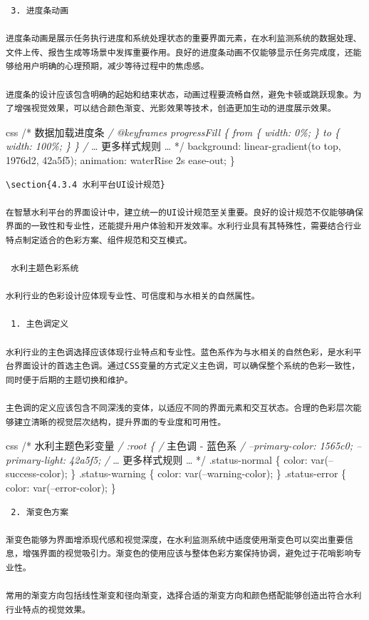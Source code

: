 \begin{lstlisting}
 3. 进度条动画

进度条动画是展示任务执行进度和系统处理状态的重要界面元素，在水利监测系统的数据处理、文件上传、报告生成等场景中发挥重要作用。良好的进度条动画不仅能够显示任务完成度，还能够给用户明确的心理预期，减少等待过程中的焦虑感。

进度条的设计应该包含明确的起始和结束状态，动画过程要流畅自然，避免卡顿或跳跃现象。为了增强视觉效果，可以结合颜色渐变、光影效果等技术，创造更加生动的进度展示效果。
\end{lstlisting}

css /* 数据加载进度条 \emph{/ @keyframes progressFill \{ from \{ width: 0\%; \} to \{ width: 100\%; \} \} /} \ldots{} 更多样式规则 \ldots{} */ background: linear-gradient(to top, 1976d2, 42a5f5); animation: waterRise 2s ease-out; \}

\begin{lstlisting}
\section{4.3.4 水利平台UI设计规范}

在智慧水利平台的界面设计中，建立统一的UI设计规范至关重要。良好的设计规范不仅能够确保界面的一致性和专业性，还能提升用户体验和开发效率。水利行业具有其特殊性，需要结合行业特点制定适合的色彩方案、组件规范和交互模式。

 水利主题色彩系统

水利行业的色彩设计应体现专业性、可信度和与水相关的自然属性。

 1. 主色调定义

水利行业的主色调选择应该体现行业特点和专业性。蓝色系作为与水相关的自然色彩，是水利平台界面设计的首选主色调。通过CSS变量的方式定义主色调，可以确保整个系统的色彩一致性，同时便于后期的主题切换和维护。

主色调的定义应该包含不同深浅的变体，以适应不同的界面元素和交互状态。合理的色彩层次能够建立清晰的视觉层次结构，提升界面的专业度和可用性。
\end{lstlisting}

css /* 水利主题色彩变量 \emph{/ :root \{ /} 主色调 - 蓝色系 \emph{/ --primary-color: 1565c0; --primary-light: 42a5f5; /} \ldots{} 更多样式规则 \ldots{} */ .status-normal \{ color: var(--success-color); \} .status-warning \{ color: var(--warning-color); \} .status-error \{ color: var(--error-color); \}

\begin{lstlisting}
 2. 渐变色方案

渐变色能够为界面增添现代感和视觉深度，在水利监测系统中适度使用渐变色可以突出重要信息，增强界面的视觉吸引力。渐变色的使用应该与整体色彩方案保持协调，避免过于花哨影响专业性。

常用的渐变方向包括线性渐变和径向渐变，选择合适的渐变方向和颜色搭配能够创造出符合水利行业特点的视觉效果。
\end{lstlisting}


